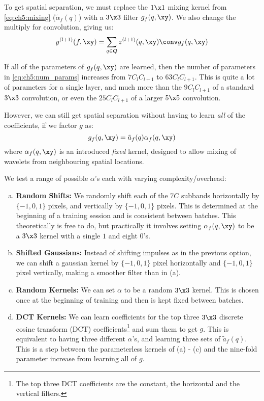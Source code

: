 To get spatial separation, we must replace the $1\x 1$ mixing kernel from
\eqref{eq:ch5:mixing} ($\tilde{\alpha}_f(q)$) with a $3\x 3$ filter $g_f(q,
\xy)$. We also change the multiply for convolution, giving us:
\begin{equation}
  y^{(l+1)}(f, \xy)  =  \sum_{q \in Q} z^{(l+1)}(q, \xy) \conv g_f(q, \xy)
\end{equation}

If all of the parameters of $g_f(q, \xy)$ are learned, then
the number of parameters in \eqref{eq:ch5:num_params} increases from $7C_l
C_{l+1}$ to $63C_l C_{l+1}$. This is quite a lot of parameters for a single
layer, and much more than the $9C_lC_{l+1}$ of a standard $3\x 3$ convolution, or
even the $25C_l C_{l+1}$ of a larger $5\x 5$ convolution.

However, we can still get spatial separation without having to learn \emph{all} of the
coefficients, if we factor $g$ as:
\begin{equation}
  g_f(q, \xy) = \tilde{a}_f(q) \alpha_f(q, \xy)
\end{equation}
where $\alpha_f(q, \xy)$ is an introduced \emph{fixed} kernel, designed to allow
mixing of wavelets from neighbouring spatial locations. 

We test a range of possible $\alpha$'s each with varying complexity/overhead:
\begin{enumerate}[(a)]
  \item \textbf{Random Shifts:} We randomly shift each of the $7C$ subbands horizontally
    by $\{-1, 0, 1\}$ pixels, and vertically by $\{-1, 0, 1\}$ pixels. This is
    determined at the beginning of a training session and is consistent between
    batches. This theoretically is free to do, but practically it involves
    setting $\alpha_f(q, \xy)$ to be a $3 \x 3$ kernel with a single $1$ and eight $0$'s.
  \item \textbf{Shifted Gaussians:} Instead of shifting impulses as in the previous option, we can shift a
    gaussian kernel by $\{-1,0,1\}$ pixel horizontally and $\{-1, 0, 1\}$ pixel vertically, making a smoother 
    filter than in (a). 
  \item \textbf{Random Kernels:} We can set $\alpha$ to be a random $3\x 3$ kernel. This is chosen once
    at the beginning of training and then is kept fixed between batches.
  \item \textbf{DCT Kernels:} We can learn coefficients for the top three $3\x 3$ discrete cosine
    transform (DCT) coefficients\footnote{The top three DCT coefficients are the 
    constant, the horizontal and the vertical filters.} and
    sum them to get $g$.
    This is equivalent to having three different $\alpha$'s, and
    learning three sets of $\tilde{a}_f(q)$. This is a step between the
    parameterless kernels of (a) - (c) and the nine-fold parameter increase from 
    learning all of $g$. 
\end{enumerate}

